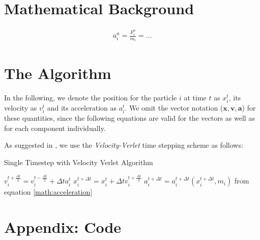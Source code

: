 \documentclass[fontsize=11pt]{scrartcl}
\begin{document}
\section{Mathematical Background}
%
\begin{align}
	a_i^n = \frac{F_i^n}{m_i} = \dots
	\label{math:acceleration}
\end{align}

\section{The Algorithm}
%
In the following, we denote the position for the particle $i$ at time $t$ as $x_i^t$, its velocity as $v_i^t$ and its acceleration as $a_i^t$.
We omit the vector notation ($\boldsymbol{x},\boldsymbol{v},\boldsymbol{a}$) for these quantities, since the following equations are valid for the vectors as well as for each component individually.
\par\medskip
%
As suggested in \cite{generalizedwallboundary}, we use the \emph{Velocity-Verlet} time stepping scheme as follows:
%
\begin{algorithm}
	\caption{Single Timestep with Velocity Verlet Algorithm}
	$v_i^{t+\frac{\Delta t}{2}} = v_i^{t - \frac{\Delta t}{2}} + \Delta t a_i^t$ \;
	$x_i^{t+\Delta t} = x_i^t + \Delta t v_i^{t+\frac{\Delta t}{2}}$ \;	
	$a_i^{t + \Delta t} = a_i^{t + \Delta t} (x_i^{t + \Delta t}, m_i)$ from equation \ref{math:acceleration} \;
\end{algorithm}




\clearpage


\section*{Appendix: Code}








\clearpage
\nocite{*}
\printbibliography
\end{document}
